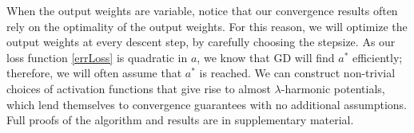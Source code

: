 \documentclass{article}
\newcommand{\N}{{\mathbb{N}}}
\newcommand{\R}{{\mathbb{R}}}
\begin{document}
When the output weights are variable, notice that our convergence results often rely on the optimality of the output weights. For this reason, we will optimize the output weights at every descent step, by carefully choosing the stepsize. As our loss function \eqref{errLoss} is quadratic in $a$, we know that GD will find $a^*$ efficiently; therefore, we will often assume that $a^*$ is reached. We can construct non-trivial choices of activation functions that give rise to almost $\lambda$-harmonic potentials, which lend themselves to convergence guarantees with no additional assumptions. Full proofs of the algorithm and results are in supplementary material.

 
\end{document}
